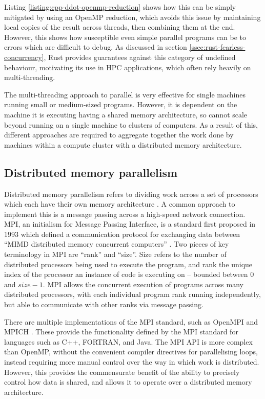 Listing \ref{listing:cpp-ddot-openmp-reduction} shows how this can be simply mitigated by using an OpenMP reduction, which avoids this issue by maintaining local copies of the result across threads, then combining them at the end. However, this shows how susceptible even simple parallel programs can be to errors which are difficult to debug. As discussed in section \ref{ssec:rust-fearless-concurrency}, Rust provides guarantees against this category of undefined behaviour, motivating its use in \acrshort{HPC} applications, which often rely heavily on multi-threading.

The multi-threading approach to parallel is very effective for single machines running small or medium-sized programs. However, it is dependent on the machine it is executing having a shared memory architecture, so cannot scale beyond running on a single machine to clusters of computers. As a result of this, different approaches are required to aggregate together the work done by machines within a compute cluster with a distributed memory architecture.

\subsection{Distributed memory parallelism}
\label{ssec:distributed-memory-paralellism}

Distributed memory parallelism refers to dividing work across a set of processors which each have their own memory architecture \cite{pattersonHennessyComputerOrganisationArchitecture}. A common approach to implement this is a message passing across a high-speed network connection. MPI, an initialism for Message Passing Interface, is a standard first proposed in 1993 which defined a communication protocol for exchanging data between ``MIMD distributed memory concurrent computers'' \cite{thempiforumMPIMessagePassing1993}. Two pieces of key terminology in MPI are ``rank'' and ``size''. Size refers to the number of distributed processors being used to execute the program, and rank the unique index of the processor an instance of code is executing on -- bounded between $0$ and $size-1$. MPI allows the concurrent execution of programs across many distributed processors, with each individual program rank running independently, but able to communicate with other ranks via message passing.

There are multiple implementations of the MPI standard, such as OpenMPI \cite{gabriel2004open} and MPICH \cite{gropp1996user}. These provide the functionality defined by the MPI standard for languages such as C++, FORTRAN, and Java. The MPI API is more complex than OpenMP, without the convenient compiler directives for parallelising loops, instead requiring more manual control over the way in which work is distributed. However, this provides the commensurate benefit of the ability to precisely control how data is shared, and allows it to operate over a distributed memory architecture.

